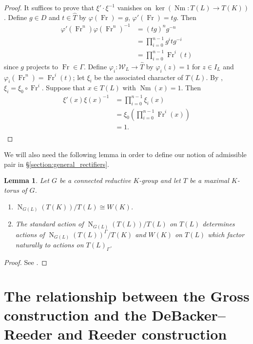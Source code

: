 \documentclass[11pt]{amsart}
\theoremstyle{plain}
\newtheorem{lemma}[theorem]{Lemma}
\theoremstyle{definition}
\DeclareMathOperator{\Nm}{Nm}
\DeclareMathOperator{\Fr}{Fr}
\newcommand{\Weil}{\mathcal{W}}
\newcommand{\Normalizer}[2]{\operatorname{N}_{#2}(#1)}
\begin{document}
\begin{proof}
It suffices to prove that $\xi' \cdot \xi^{-1}$ vanishes on
$\ker(\Nm : T(L) \rightarrow T(K))$.  Define $g \in D$ and $t \in \hat{T}$ by
$\varphi(\Fr) = g$, $\varphi'(\Fr) = tg$.  Then
\begin{align*}
\varphi'(\Fr^n) \varphi(\Fr^n)^{-1} &= (tg)^n g^{-n} \\
&= \prod_{i=0}^{n-1} g^i t g^{-i} \\
&= \prod_{i=0}^{n-1} \Fr^i(t)
\end{align*}
since $g$ projects to $\Fr \in \Gamma$.  Define $\varphi_i \colon \Weil_L \rightarrow \hat{T}$
by $\varphi_i(z) = 1$ for $z \in I_L$ and
$\varphi_i(\Fr^n) = \Fr^i(t)$; let $\xi_i$ be the associated character
of $T(L)$.  By \cite[Lem. 4.3.1]{reeder-debacker:09a}, $\xi_i = \xi_0 \circ \Fr^i.$
Suppose that $x \in T(L)$ with $\Nm(x) = 1$.  Then
\begin{align*}
\xi'(x) \xi(x)^{-1} &= \prod_{i=0}^{n-1} \xi_i(x) \\
&= \xi_0 \left(\prod_{i=0}^{n-1}\Fr^i(x)\right) \\
&= 1.\\
\end{align*}
\end{proof}

We will also need the following lemma in order to define our notion of admissible pair
in \S\ref{section:general_rectifiers}.

\begin{lemma} \label{lem:weyl_groups}
Let $G$ be a connected reductive $K$-group and let $T$ be a maximal
$K$-torus of $G$.
\begin{enumerate}
\item $\Normalizer{T(K)}{G(L)} / T(L) \cong W(K)$.
\item The standard action of $\Normalizer{T(L)}{G(L)} / T(L)$ on $T(L)$ determines
actions of $\Normalizer{T(L)}{G(L)}^\Gamma / T(K)$ and $W(K)$
on $T(L)$ which factor naturally to actions on $T(L)_\Gamma$.
\end{enumerate}
\end{lemma}

\begin{proof}
See \cite[Lem. 9.1]{adrian-lansky:ppa}.
\end{proof}

\section{The relationship between the Gross construction and the DeBacker--Reeder and Reeder construction}
\label{section:gross_debacker_reeder}
\end{document}
